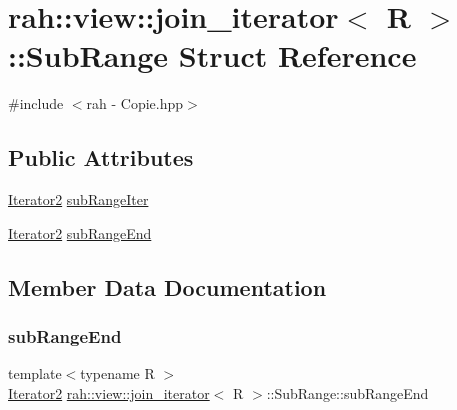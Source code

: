 \hypertarget{structrah_1_1view_1_1join__iterator_1_1_sub_range}{}\section{rah\+::view\+::join\+\_\+iterator$<$ R $>$\+::Sub\+Range Struct Reference}
\label{structrah_1_1view_1_1join__iterator_1_1_sub_range}


{\ttfamily \#include $<$rah -\/ Copie.\+hpp$>$}

\subsection*{Public Attributes}
\begin{DoxyCompactItemize}
\item 
\mbox{\hyperlink{structrah_1_1view_1_1join__iterator_ae03a066174f3422c70d0e3c22e68d9f7}{Iterator2}} \mbox{\hyperlink{structrah_1_1view_1_1join__iterator_1_1_sub_range_a4073148b86fc958e754b23af1befce93}{sub\+Range\+Iter}}
\item 
\mbox{\hyperlink{structrah_1_1view_1_1join__iterator_ae03a066174f3422c70d0e3c22e68d9f7}{Iterator2}} \mbox{\hyperlink{structrah_1_1view_1_1join__iterator_1_1_sub_range_a59768b4f12beb31f228a01dad4618c8c}{sub\+Range\+End}}
\end{DoxyCompactItemize}


\subsection{Member Data Documentation}
\mbox{\label{structrah_1_1view_1_1join__iterator_1_1_sub_range_a59768b4f12beb31f228a01dad4618c8c}} 
\subsubsection{\texorpdfstring{subRangeEnd}{subRangeEnd}}
{\footnotesize\ttfamily template$<$typename R $>$ \\
\mbox{\hyperlink{structrah_1_1view_1_1join__iterator_ae03a066174f3422c70d0e3c22e68d9f7}{Iterator2}} \mbox{\hyperlink{structrah_1_1view_1_1join__iterator}{rah\+::view\+::join\+\_\+iterator}}$<$ R $>$\+::Sub\+Range\+::sub\+Range\+End}

